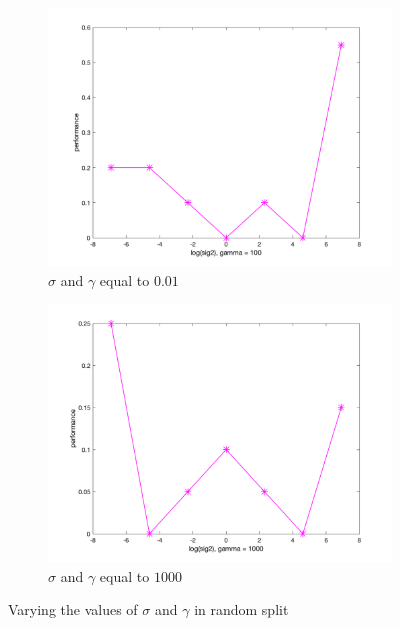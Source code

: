 \documentclass[a4paper, 11pt, one column]{article}
\begin{document}
\begin{figure}[]
\begin{subfigure}{0.33\linewidth}
            \includegraphics[width=\linewidth]{images/rsplit_100.png}
            \caption{$\sigma$ and $\gamma$ equal to $0.01$}
        \end{subfigure}
        \begin{subfigure}{0.33\linewidth}
            \includegraphics[width=\linewidth]{images/rsplit_1000.png}
            \caption{$\sigma$ and $\gamma$ equal to $1000$}
        \end{subfigure}
        \caption{Varying the values of $\sigma$ and $\gamma$ in random split}
        \label{fig:randomval}
\end{figure}
\end{document}
